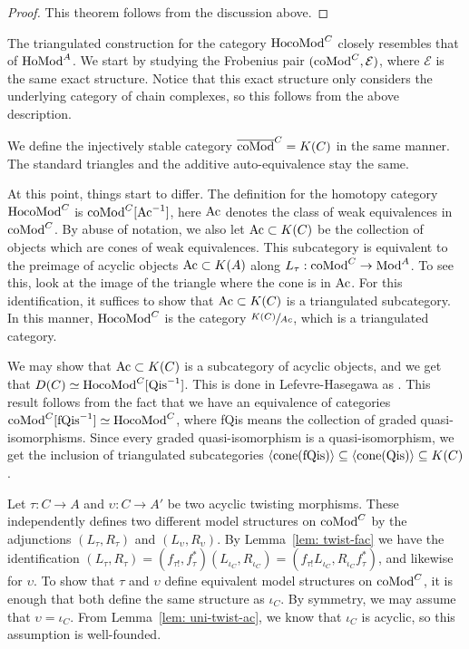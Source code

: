 \documentclass[../thesis.tex]{subfiles}
\begin{document}
            \begin{proof}
                This theorem follows from the discussion above.
            \end{proof}

            The triangulated construction for the category $\tt{Ho} \tt{coMod}^C$ closely resembles that of $\tt{Ho} \tt{Mod}^A$. We start by studying the Frobenius pair $(\tt{coMod}^C, \mathcal{E})$, where $\mathcal{E}$ is the same exact structure. Notice that this exact structure only considers the underlying category of chain complexes, so this follows from the above description.

            We define the injectively stable category $\overline{\tt{coMod}}^C = K(C)$ in the same manner. The standard triangles and the additive auto-equivalence stay the same.

            At this point, things start to differ. The definition for the homotopy category $\tt{Ho} \tt{coMod}^C$ is $\tt{coMod}^C[\tt{Ac}^{-1}]$, here $\tt{Ac}$ denotes the class of weak equivalences in $\tt{coMod}^C$. By abuse of notation, we also let $\tt{Ac}\subset K(C)$ be the collection of objects which are cones of weak equivalences. This subcategory is equivalent to the preimage of acyclic objects $\tt{Ac}\subset K(A)$ along $L_\tau: \tt{coMod}^C \rightarrow \tt{Mod}^A$. To see this, look at the image of the triangle where the cone is in $\tt{Ac}$. For this identification, it suffices to show that $\tt{Ac}\subset K(C)$ is a triangulated subcategory. In this manner, $\tt{Ho} \tt{coMod}^C$ is the category $\sfrac{K(C)}{Ac}$, which is a triangulated category.

            \begin{remark}
                We may show that $\tt{Ac}\subset K(C)$ is a subcategory of acyclic objects, and we get that $D(C) \simeq \tt{Ho} \tt{coMod}^C[\tt{Qis}^{-1}]$. This is done in Lefevre-Hasegawa as \cite[Proposition 1.3.5.1][51]{LefevreHasegawa03} \cite[Lemma 2.2.2.11][75]{LefevreHasegawa03}. This result follows from the fact that we have an equivalence of categories $\tt{coMod}^C[\tt{fQis}^{-1}]\simeq \tt{Ho} \tt{coMod}^C$, where fQis means the collection of graded quasi-isomorphisms. Since every graded quasi-isomorphism is a quasi-isomorphism, we get the inclusion of triangulated subcategories $\langle \tt{cone}(\tt{fQis})\rangle \subseteq \langle \tt{cone}(\tt{Qis})\rangle \subseteq K(C)$.
            \end{remark}

            Let $\tau: C \rightarrow A$ and $\upsilon: C \rightarrow A'$ be two acyclic twisting morphisms. These independently defines two different model structures on $\tt{coMod}^C$ by the adjunctions $(L_\tau, R_\tau)$ and $(L_\upsilon, R_\upsilon)$. By Lemma~\ref{lem: twist-fac} we have the identification $(L_\tau, R_\tau) = (f_{\tau !},f_\tau^*)(L_{\iota_C},R_{\iota_C}) = (f_{\tau !}L_{\iota_C},R_{\iota_C}f_\tau^*)$, and likewise for $\upsilon$. To show that $\tau$ and $\upsilon$ define equivalent model structures on $\tt{coMod}^C$, it is enough that both define the same structure as $\iota_C$. By symmetry, we may assume that $\upsilon = \iota_C$. From Lemma~\ref{lem: uni-twist-ac}, we know that $\iota_C$ is acyclic, so this assumption is well-founded.
\end{document}
